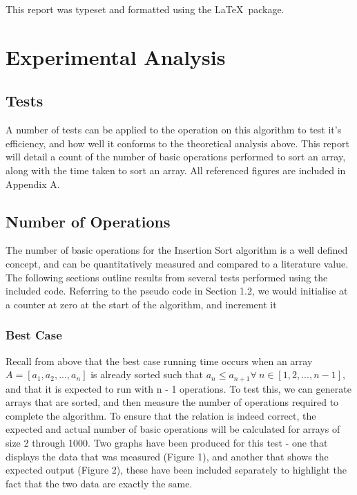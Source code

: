 \documentclass{article}
\begin{document}
    This report was typeset and formatted using the \LaTeX\  package.

\section{Experimental Analysis}
    \subsection{Tests}
        A number of tests can be applied to the operation on this algorithm to test it's efficiency, and how well it conforms to the theoretical analysis above. This report will detail a count of the number of basic operations performed to sort an array, along with the time taken to sort an array. All referenced figures are included in Appendix A.

    \subsection{Number of Operations}
        The number of basic operations for the Insertion Sort algorithm is a well defined concept, and can be quantitatively measured and compared to a literature value. The following sections outline results from several tests performed using the included code. Referring to the pseudo code in Section 1.2, we would initialise at a counter at zero at the start of the algorithm, and increment it
        \subsubsection{Best Case}
            Recall from above that the best case running time occurs when an array $A = [a_1, a_2, ..., a_n]$ is already sorted such that $a_n \leq a_{n+1} \forall\ n \in [1, 2, ..., n - 1]$, and that it is expected to run with n - 1 operations. To test this, we can generate arrays that are sorted, and then measure the number of operations required to complete the algorithm. To ensure that the relation is indeed correct, the expected and actual number of basic operations will be calculated for arrays of size 2 through 1000. Two graphs have been produced for this test - one that displays the data that was measured (Figure 1), and another that shows the expected output (Figure 2), these have been included separately to highlight the fact that the two data are exactly the same.
\end{document}
